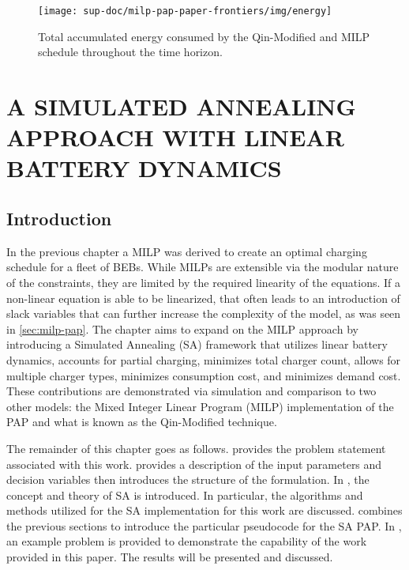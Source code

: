 \documentclass[ee,thesis]{usuthesis}
\begin{document}
\begin{figure}[htpb]
\centering
    \texttt{[image: sup-doc/milp-pap-paper-frontiers/img/energy]}
    \caption{Total accumulated energy consumed by the Qin-Modified and MILP schedule throughout the time horizon.}
    \label{fig:energy-usage}
\end{figure}

\chapter{A SIMULATED ANNEALING APPROACH WITH LINEAR BATTERY DYNAMICS}
\label{sec:sa-pap}
\section{Introduction}
\label{sec:sa-introduction}
In the previous chapter a MILP was derived to create an optimal charging schedule for a fleet of BEBs. While MILPs are
extensible via the modular nature of the constraints, they are limited by the required linearity of the equations. If a
non-linear equation is able to be linearized, that often leads to an introduction of slack variables that can further
increase the complexity of the model, as was seen in \ref{sec:milp-pap}. The chapter aims to expand on the MILP approach by
introducing a Simulated Annealing (SA) framework that utilizes linear battery dynamics, accounts for partial charging,
minimizes total charger count, allows for multiple charger types, minimizes consumption cost, and minimizes demand cost.
These contributions are demonstrated via simulation and comparison to two other models: the Mixed Integer Linear Program
(MILP) implementation of the PAP and what is known as the Qin-Modified technique.

The remainder of this chapter goes as follows. provides the problem statement associated
with this work. provides a description of the input parameters and decision variables then
introduces the structure of the formulation. In , the concept and theory of SA is introduced.
In particular, the algorithms and methods utilized for the SA implementation for this work are discussed.
combines the previous sections to introduce the particular pseudocode for the SA PAP. In
, an example problem is provided to demonstrate the capability of the work provided in this paper. The
results will be presented and discussed.
\end{document}
